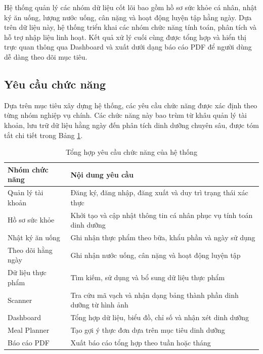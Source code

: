 \documentclass[12pt, a4paper]{report}
\begin{document}
Hệ thống quản lý các nhóm dữ liệu cốt lõi bao gồm hồ sơ sức khỏe cá nhân, nhật ký ăn uống, lượng nước uống, cân nặng và hoạt động luyện tập hằng ngày. Dựa trên dữ liệu này, hệ thống triển khai các nhóm chức năng tính toán, phân tích và hỗ trợ nhập liệu linh hoạt. Kết quả xử lý cuối cùng được tổng hợp và hiển thị trực quan thông qua Dashboard và xuất dưới dạng báo cáo PDF để người dùng dễ dàng theo dõi mục tiêu.

\subsection{Yêu cầu chức năng}
Dựa trên mục tiêu xây dựng hệ thống, các yêu cầu chức năng được xác định theo từng nhóm nghiệp vụ chính. Các chức năng này bao trùm từ khâu quản lý tài khoản, lưu trữ dữ liệu hằng ngày đến phân tích dinh dưỡng chuyên sâu, được tóm tắt chi tiết trong Bảng \ref{tab:tong_hop_chuc_nang}.

\begin{table}[htbp]
    \centering
    \caption{Tổng hợp yêu cầu chức năng của hệ thống}
\label{tab:tong_hop_chuc_nang}
    \vspace{4pt}
    \renewcommand{\arraystretch}{1.3}
    \begin{tabular}{|>{\raggedright\arraybackslash}p{4cm}|p{11cm}|}
        \hline
        \textbf{Nhóm chức năng} & \textbf{Nội dung yêu cầu} \\
        \hline
        Quản lý tài khoản & Đăng ký, đăng nhập, đăng xuất và duy trì trạng thái xác thực \\
        \hline
        Hồ sơ sức khỏe & Khởi tạo và cập nhật thông tin cá nhân phục vụ tính toán dinh dưỡng \\
        \hline
        Nhật ký ăn uống & Ghi nhận thực phẩm theo bữa, khẩu phần và ngày sử dụng \\
        \hline
        Theo dõi hằng ngày & Ghi nhận nước uống, cân nặng và hoạt động luyện tập \\
        \hline
        Dữ liệu thực phẩm & Tìm kiếm, sử dụng và bổ sung dữ liệu thực phẩm \\
        \hline
        Scanner & Tra cứu mã vạch và nhận dạng bảng thành phần dinh dưỡng từ hình ảnh \\
        \hline
        Dashboard & Tổng hợp dữ liệu, biểu đồ, chỉ số và nhận xét dinh dưỡng \\
        \hline
        Meal Planner & Tạo gợi ý thực đơn dựa trên mục tiêu dinh dưỡng \\
        \hline
        Báo cáo PDF & Xuất báo cáo tổng hợp theo tuần hoặc tháng \\
        \hline
    \end{tabular}
\end{table}
\end{document}

